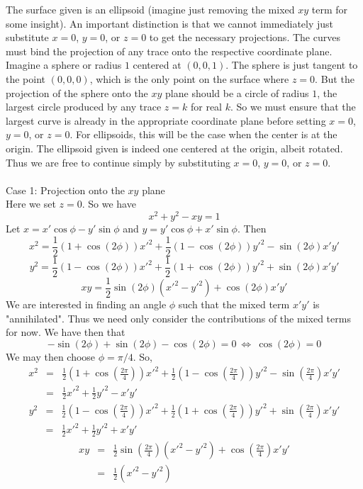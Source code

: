 \documentclass[12pt]{amsbook}
\begin{document}
The surface given is an ellipsoid (imagine just removing the mixed $xy$ term for some insight). An important distinction is that we cannot immediately just substitute $x=0$, $y=0$, or $z=0$ to get the necessary projections. The curves must bind the projection of any trace onto the respective coordinate plane. Imagine a sphere  or radius $1$ centered at $(0,0,1)$. The sphere is just tangent to the point $(0,0,0)$, which is the only point on the surface where $z=0$. But the projection of the sphere onto the $xy$ plane should be a circle of radius $1$, the largest circle produced by any trace $z=k$ for real $k$. So we must ensure that the largest curve is already in the appropriate coordinate plane before setting $x=0$, $y=0$, or $z=0$. For ellipsoids, this will be the case when the center is at the origin. The ellipsoid given is indeed one centered at the origin, albeit rotated. Thus we are free to continue simply by substituting $x=0$, $y=0$, or $z=0$. 
\\
\\
Case 1: Projection onto the $xy$ plane
\\
Here we set $z=0$. So we have
$$x^2+y^2-xy=1$$
Let $x=x'\cos\phi-y'\sin\phi$ and $y=y'\cos\phi+x'\sin\phi$. Then
$$x^2=\frac{1}{2}(1+\cos(2\phi))x'^2+\frac{1}{2}(1-\cos(2\phi))y'^2-\sin(2\phi)x'y'$$
$$y^2=\frac{1}{2}(1-\cos(2\phi))x'^2+\frac{1}{2}(1+\cos(2\phi))y'^2+\sin(2\phi)x'y'$$
$$xy=\frac{1}{2}\sin(2\phi)(x'^2-y'^2)+\cos(2\phi)x'y'$$
We are interested in finding an angle $\phi$ such that the mixed term $x'y'$ is "annihilated". Thus we need only consider the contributions of the mixed terms for now. We have then that
$$-\sin(2\phi)+\sin(2\phi)-\cos(2\phi)=0 \ \Leftrightarrow \ \cos(2\phi)=0$$
We may then choose $\phi=\pi/4$. So,
\begin{eqnarray*}
x^2&=&\frac{1}{2}(1+\cos(\frac{2\pi}{4}))x'^2+\frac{1}{2}(1-\cos(\frac{2\pi}{4}))y'^2-\sin(\frac{2\pi}{4})x'y'\\
&=&\frac{1}{2}x'^2+\frac{1}{2}y'^2-x'y'
\end{eqnarray*}
\begin{eqnarray*}
y^2&=&\frac{1}{2}(1-\cos(\frac{2\pi}{4}))x'^2+\frac{1}{2}(1+\cos(\frac{2\pi}{4}))y'^2+\sin(\frac{2\pi}{4})x'y'\\
&=&\frac{1}{2}x'^2+\frac{1}{2}y'^2+x'y'
\end{eqnarray*}
\begin{eqnarray*}
xy&=&\frac{1}{2}\sin(\frac{2\pi}{4})(x'^2-y'^2)+\cos(\frac{2\pi}{4})x'y'\\
&=&\frac{1}{2}(x'^2-y'^2)
\end{eqnarray*}
\end{document}
